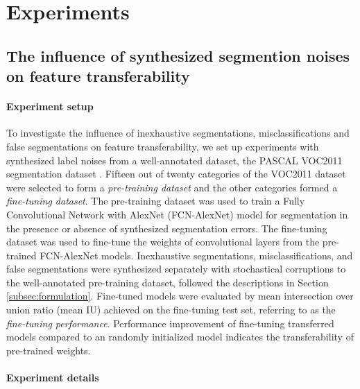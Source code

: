 \section{Experiments}
\label{sec:experiments}

\subsection{The influence of synthesized segmention noises on feature transferability}
\label{subsec:robustness}


\paragraph{Experiment setup}

To investigate the influence of inexhaustive segmentations, misclassifications and false segmentations on feature transferability, we set up experiments with synthesized label noises from a well-annotated dataset, the PASCAL VOC2011 segmentation dataset  \cite{everingham2015pascal}.
Fifteen out of twenty categories of the VOC2011 dataset were selected to form a \textit{pre-training dataset} and the other categories formed a \textit{fine-tuning dataset}.
The pre-training dataset was used to train a Fully Convolutional Network with AlexNet (FCN-AlexNet) model \cite{long2015fully} for segmentation in the presence or absence of synthesized segmentation errors.
The fine-tuning dataset was used to fine-tune the weights of convolutional layers from the pre-trained FCN-AlexNet models.
Inexhaustive segmentations, misclassifications, and false segmentations were synthesized separately with stochastical corruptions to the well-annotated pre-training dataset, followed the descriptions in Section \ref{subsec:formulation}.
Fine-tuned models were evaluated by mean intersection over union ratio (mean IU) achieved on the fine-tuning test set, referring to as the \textit{fine-tuning performance}.
Performance improvement of fine-tuning transferred models compared to an randomly initialized model indicates the transferability of pre-trained weights.

\paragraph{Experiment details}

